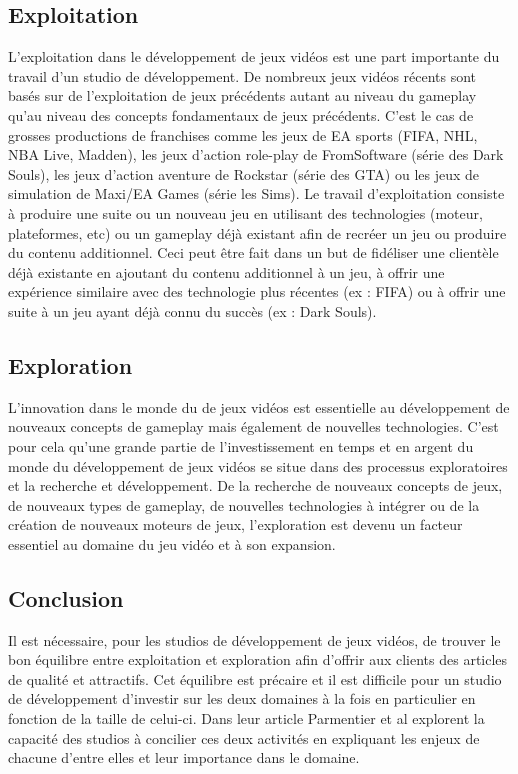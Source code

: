 \subsection{Exploitation}
L'exploitation dans le développement de jeux vidéos est une part importante du travail d'un studio de développement. De nombreux jeux vidéos récents sont basés sur de l'exploitation de jeux précédents autant au niveau du gameplay qu'au niveau des concepts fondamentaux de jeux précédents. C'est le cas de grosses productions de franchises comme les jeux de EA sports (FIFA, NHL, NBA Live, Madden), les jeux d'action role-play de FromSoftware (série des Dark Souls), les jeux d'action aventure de Rockstar (série des GTA) ou les jeux de simulation de Maxi/EA Games (série les Sims). Le travail d'exploitation consiste à produire une suite ou un nouveau jeu en utilisant des technologies (moteur, plateformes, etc) ou un gameplay déjà existant afin de recréer un jeu ou produire du contenu additionnel. Ceci peut être fait dans un but de fidéliser une clientèle déjà existante en ajoutant du contenu additionnel à un jeu, à offrir une expérience similaire avec des technologie plus récentes (ex : FIFA) ou à offrir une suite à un jeu ayant déjà connu du succès (ex : Dark Souls).

\subsection{Exploration}
L'innovation dans le monde du de jeux vidéos est essentielle au développement de nouveaux concepts de gameplay mais également de nouvelles technologies. C'est pour cela qu'une grande partie de l'investissement en temps et en argent du monde du développement de jeux vidéos se situe dans des processus exploratoires et la recherche et développement. De la recherche de nouveaux concepts de jeux, de nouveaux types de gameplay, de nouvelles technologies à intégrer ou de la création de nouveaux moteurs de jeux, l'exploration est devenu un facteur essentiel au domaine du jeu vidéo et à son expansion.


\subsection{Conclusion}
Il est nécessaire, pour les studios de développement de jeux vidéos, de trouver le bon équilibre entre exploitation et exploration afin d'offrir aux clients des articles de qualité et attractifs. Cet équilibre est précaire et il est difficile pour un studio de développement d'investir sur les deux domaines à la fois en particulier en fonction de la taille de celui-ci. Dans leur article Parmentier et al \cite{ParmentierGuy2009Iecd} explorent la capacité des studios à concilier ces deux activités en expliquant les enjeux de chacune d'entre elles et leur importance dans le domaine.




